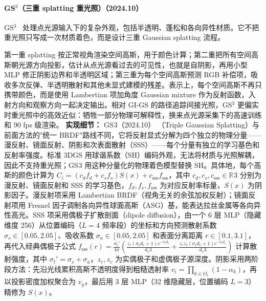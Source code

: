\paragraph{GS$^3$（三重 splatting 重光照）（2024.10）}
GS$^3$~\cite{2410_11419} 处理点光源输入下的复杂外观，包括半透明、蓬松和各向异性材质。它不把重光照只写成一次材质着色，而是设计三重 Gaussian splatting 流程。

第一重 splatting 按正常视角渲染空间高斯，用于颜色计算；第二重把所有空间高斯朝光源方向投影，估计从点光源看过去的可见性，也就是自阴影，再用小型 MLP 修正阴影边界和半透明区域；第三重为每个空间高斯预测 RGB 补偿项，吸收多次反弹、半透明散射和其他未显式建模的残差。表示上，每个空间高斯不再只携带颜色，而是使用 Lambertian 项加角度 Gaussian mixture 作为反射函数，入射方向和观察方向一起决定输出。相对 GI-GS 的路径追踪间接光照，GS$^3$ 更偏实时重光照中的高效近似：牺牲一部分物理可解释性，换来点光源采集下的高速训练和 90 fps 级渲染。
\textbf{实现细节：} GS$^{}3$（2024.10） （Triple Gaussian Splatting）与前面方法的"统一 BRDF"路线不同，它将反射显式分解为四个独立的物理分量——漫反射、镜面反射、阴影和次表面散射（SSS）——每个分量有独立的学习基色和反射率强度。标准 3DGS 用球谐系数（SH）编码外观，无法将材质与光照解耦，因此不支持重光照；GS$^{}3$ 用这种分量化的物理着色模型替换 SH。具体地，每个高斯的颜色计算为 $C_i = (c_d f_d + c_s f_s) S(x) + c_{\mathrm{sss}} f_{\mathrm{sss}}$，其中 $c_d, c_s, c_{\mathrm{sss}} \in \mathbb{R}^{}3$ 分别为漫反射、镜面反射和 SSS 的学习基色，$f_d, f_s, f_{\mathrm{sss}}$ 为对应反射率标量，$S(x)$ 为阴影因子。漫反射项采用 Lambertian BRDF（视角无关的余弦加权反射）；镜面反射项用 Fresnel 因子调制各向异性球面高斯（ASG）基，能表达拉丝金属等各向异性高光。SSS 项采用偶极子扩散剖面（dipole diffusion），由一个 6 层 MLP（隐藏维度 256）从位置编码（$L=4$ 频率段）的坐标和方向预测散射系数 $\sigma_s \in [0.05, 2.05]$、吸收系数 $\sigma_a \in [0.05, 2.05]$ 和表面分离距离 $r \in [0.1, 3.1]$，再代入经典偶极子公式 $f_{\mathrm{sss}}(r) = \frac{\sigma_t'}{4\pi}\!\left(\frac{z_r(\sigma_t d_r + 1)e^{-\sigma_t d_r}}{d_r^{}3} + \frac{z_r z_v(\sigma_t d_v + 1)e^{-\sigma_t d_v}}{d_v^{}3}\right)$ 计算散射强度，其中 $\sigma_t' = \sigma_s + \sigma_a$，$z_r, z_v$ 为实偶极子和虚偶极子源深度。阴影采用两阶段方法：先沿光线累积高斯不透明度得到粗糙透射率 $v_i = \prod_{k \in O_i}(1-\alpha_k)$，再以投影密度加权聚合为 $v_g$，最后用 3 层 MLP（32 维隐藏层，位置编码 $L=3$）精修为 $S(x)$。
